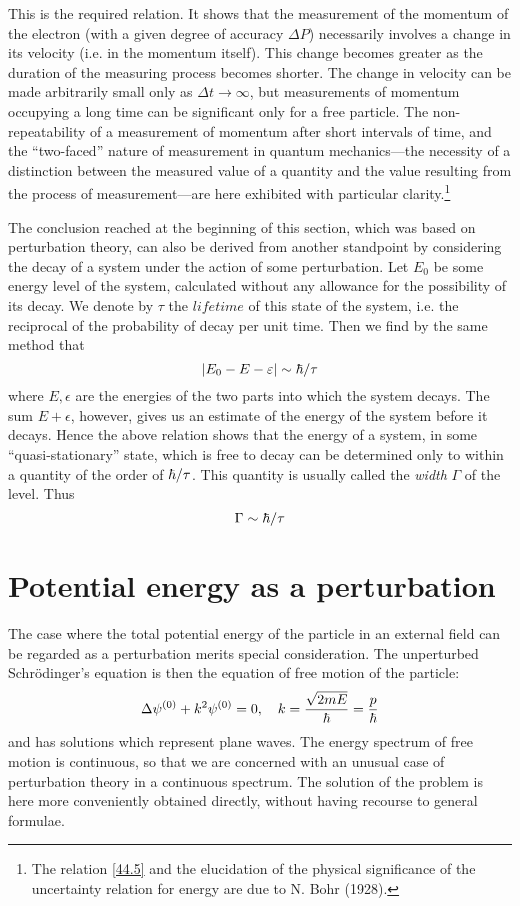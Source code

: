 This is the required relation. It shows that the measurement of the momentum of the electron (with a given degree of accuracy $ \Delta P $) necessarily involves a change in its velocity (i.e. in the momentum itself). This change becomes greater as the duration of the measuring process becomes shorter. The change in velocity can be made arbitrarily small only as $ \Delta t \to \infty $, but measurements of momentum occupying a long time can be significant only for a free particle. The non-repeatability of a measurement of momentum after short intervals of time, and the “two-faced” nature of measurement in quantum mechanics—the necessity of a distinction between the measured value of a quantity and the value resulting from the process of measurement—are here exhibited with particular clarity.\footnote{The relation \eqref{44.5} and the elucidation of the physical significance of the uncertainty relation for energy are due to N. Bohr (1928).}

The conclusion reached at the beginning of this section, which was based on perturbation theory, can also be derived from another standpoint by considering the decay of a system under the action of some perturbation. Let $ E_0 $ be some energy level of the system, calculated without any allowance for the possibility of its decay. We denote by $\tau$ the $ lifetime $ of this state of the system, i.e. the reciprocal of the probability of decay per unit time. Then we find by the same method that
\begin{equation}\label{44.6}
|E_0-E-\varepsilon|\sim\hbar/\tau
\end{equation}
where $ E, \epsilon $ are the energies of the two parts into which the system decays. The sum $ E+\epsilon $, however, gives us an estimate of the energy of the system before it decays. Hence the above relation shows that the energy of a system, in some “quasi-stationary” state, which is free to decay can be determined only to within a quantity of the order of $ \hbar/\tau $. This quantity is usually called the \textit{width} $\Gamma$ of the level. Thus
\begin{equation}\label{44.7}
\Gamma\sim\hbar/\tau
\end{equation}

\section{Potential energy as a perturbation}\label{Potential energy as a perturbation}
The case where the total potential energy of the particle in an external field can be regarded as a perturbation merits special consideration. The unperturbed Schrödinger’s equation is then the equation of free motion of the particle:
\begin{equation}\label{45.1}
\Delta \psi^{(0)}+k^2\psi^{(0)}=0,\quad k=\frac{\sqrt{2mE}}{\hbar}=\frac{p}{\hbar}
\end{equation}
and has solutions which represent plane waves. The energy spectrum of free motion is continuous, so that we are concerned with an unusual case of perturbation theory in a continuous spectrum. The solution of the problem is here more conveniently obtained directly, without having recourse to general formulae.

